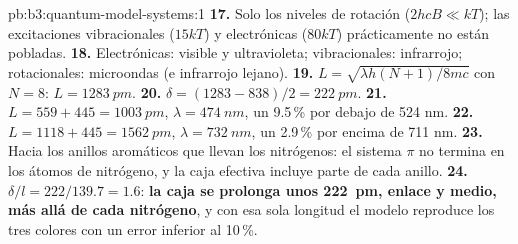 \begin{solution}{pb:b3:quantum-model-systems:1}
\textbf{17.} Solo los niveles de rotación ($2hcB \ll kT$); las excitaciones vibracionales ($15kT$) y
electrónicas ($80kT$) prácticamente no están pobladas.
\textbf{18.} Electrónicas: visible y ultravioleta; vibracionales: infrarrojo;
rotacionales: microondas (e infrarrojo lejano).
\textbf{19.} $L = \sqrt{\lambda h(N+1)/8mc}$ con $N = 8$: $L = \qty{1283}{pm}$.
\textbf{20.} $\delta = (1283 - 838)/2 = \qty{222}{pm}$.
\textbf{21.} $L = 559 + 445 = \qty{1003}{pm}$, $\lambda = \qty{474}{nm}$, un 9.5\,\%
por debajo de 524 nm.
\textbf{22.} $L = 1118 + 445 = \qty{1562}{pm}$, $\lambda = \qty{732}{nm}$, un 2.9\,\%
por encima de 711 nm.
\textbf{23.} Hacia los anillos aromáticos que llevan los nitrógenos: el sistema
$\pi$ no termina en los átomos de nitrógeno, y la caja efectiva incluye
parte de cada anillo.
\textbf{24.} $\delta/l = 222/139.7 = 1.6$: \textbf{la caja se prolonga unos
\qty{222}{pm}, enlace y medio, más allá de cada nitrógeno}, y con esa sola
longitud el modelo reproduce los tres colores con un error inferior al 10\,\%.
\end{solution}
